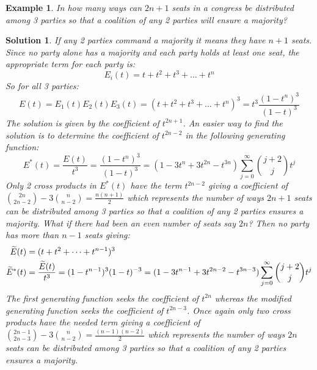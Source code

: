 \documentclass[12pt, letterpaper, onecolumn, conference, final]{IEEEtran}
\theoremstyle{definition}
\theoremstyle{plain}
\newtheorem{example}{Example}[section]
\newtheorem{solution}{Solution}[section]
\begin{document}
\begin{example}
In how many ways can $2n+1$ seats in a congress be distributed among 3 parties so that a coalition of any 2 parties will ensure a majority? 
\end{example}
\begin{solution}
If any 2 parties command a majority it means they have $n+1$ seats. Since no party alone has a majority and each party holds at least one seat, the appropriate term for each party is:
\begin{equation*}
E_i(t) = t + t^2 + t^3 + \dots + t^n
\end{equation*}
So for all 3 parties:
\begin{equation*}
E(t) = E_1(t)E_2(t)E_3(t) = (t + t^2 + t^3 + \dots + t^n)^3 = t^3 \frac{(1-t^n)^3}{(1-t)^3}
\end{equation*}
The solution is given by the coefficient of $t^{2n+1}$. An easier way to find the solution is to determine the coefficient of $t^{2n-2}$ in the following generating function:
\begin{equation*}
E^*(t) = \frac{E(t)}{t^3} = \frac{(1-t^n)^3}{(1-t)^3} = (1 - 3t^n + 3t^{2n} - t^{3n}) \sum_{j=0}^\infty {j+2 \choose j} t^j
\end{equation*}
Only 2 cross products in $E^*(t)$ have the term $t^{2n-2}$ giving a coefficient of ${2n \choose 2n-2} - 3{n \choose n-2} = \frac{n(n+1)}{2}$ which represents the number of ways $2n+1$ seats can be distributed among 3 parties so that a coalition of any 2 parties ensures a majority. What if there had been an even number of seats say $2n$? Then no party has more than $n-1$ seats giving:
\begin{equation*}
\begin{split}
\widetilde{E}(t) &= (t + t^2 + \dots + t^{n-1})^3 \hspace{.3cm} \\
\widetilde{E}^*(t) &= \frac{\widetilde{E}(t)}{t^3} = (1 -t^{n-1})^3 (1 - t)^{-3} = (1 - 3t^{n-1} + 3t^{2n-2} - t^{3n-3}) \sum_{j=0}^\infty {j+2 \choose j} t^j
\end{split}
\end{equation*}
The first generating function seeks the coefficient of $t^{2n}$ whereas the modified generating function seeks the coefficient of $t^{2n-3}$. Once again only two cross products have the needed term giving a coefficient of ${2n-1 \choose 2n-3} - 3{n \choose n-2} = \frac{(n-1)(n-2)}{2}$ which represents the number of ways $2n$ seats can be distributed among 3 parties so that a coalition of any 2 parties ensures a majority.
\end{solution}
\end{document}
